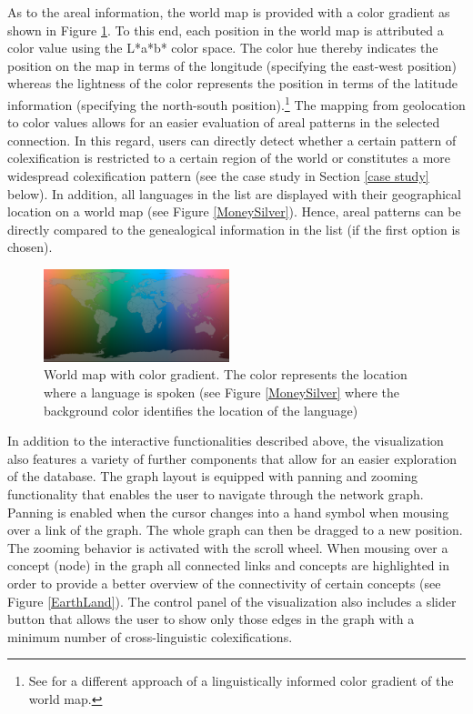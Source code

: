 As to the areal information, the world map is provided with a color gradient as shown in Figure \ref{World map}. To this end, each position in the world map is attributed a color value using the L*a*b* color space. The color hue thereby indicates the position on the map in terms of the longitude (specifying the east-west position) whereas the lightness of the color represents the position in terms of the latitude information (specifying the north-south position).\footnote{See  for a different approach of a linguistically informed color gradient of the world map.}
The mapping from geolocation to color values allows for an easier evaluation of areal patterns in the selected connection. In this regard, users can directly detect whether a certain pattern of colexification is restricted to a certain region of the world or constitutes a more widespread colexification pattern (see the case study in Section \ref{case study} below). In addition, all languages in the list are displayed with their geographical location on a world map (see Figure \ref{MoneySilver}). Hence, areal patterns can be directly compared to the genealogical information in the list (if the first option is chosen).

\begin{figure}[htbp]
\begin{center}
\includegraphics[width=0.48\textwidth]{img/ColorScaleWorld.png}
\caption{World map with color gradient. The color represents the location where a language is spoken (see Figure \ref{MoneySilver} where the background color identifies the location of the language)
}
\label{World map}
\end{center}
\end{figure}



In addition to the interactive functionalities described above, the visualization also features a variety of further components that allow for an easier exploration of the database. The graph layout is equipped with panning and zooming functionality that enables the user to navigate through the network graph. Panning is enabled when the cursor changes into a hand symbol when mousing over a link of the graph. The whole graph can then be dragged to a new position. The zooming behavior is activated with the scroll wheel. 
When mousing over a concept (node) in the graph all connected links and concepts are highlighted
in order to provide a better overview of the connectivity of certain concepts (see Figure \ref{EarthLand}). The control panel of the visualization also includes a slider button that allows the user to show only those edges in the graph with a minimum number of cross-linguistic colexifications. 

